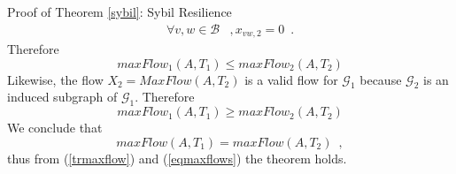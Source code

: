 \begin{sepproof}{Proof of Theorem \ref{sybil}: Sybil Resilience}
\begin{align*}
      \forall v,w \in \mathcal{B}&, x_{vw,2} = 0 \enspace.
   \end{align*}
   Therefore
   \begin{equation*}
      maxFlow_1\left(A, T_1\right) \leq maxFlow_2\left(A, T_2\right)
   \end{equation*}
   Likewise, the flow $X_2 = MaxFlow(A, T_2)$ is a valid flow for $\mathcal{G}_1$ because $\mathcal{G}_2$ is an induced
   subgraph of $\mathcal{G}_1$. Therefore
   \begin{equation*}
      maxFlow_1\left(A, T_1\right) \geq maxFlow_2\left(A, T_2\right)
   \end{equation*}
   We conclude that
   \begin{equation}
   \label{eqmaxflows}
      maxFlow\left(A, T_1\right) = maxFlow\left(A, T_2\right) \enspace,
   \end{equation}
   thus from (\ref{trmaxflow}) and (\ref{eqmaxflows}) the theorem holds.
\end{sepproof}
